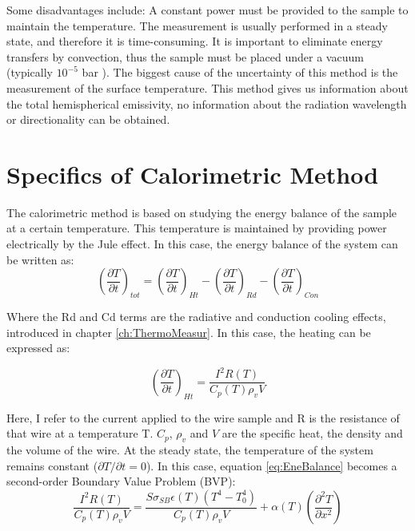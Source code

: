 Some disadvantages include: A constant power must be provided to the sample to maintain the temperature. The measurement is usually performed in a steady state, and therefore it is time-consuming. It is important to eliminate energy transfers by convection, thus the sample must be placed under a vacuum (typically $10^{-5}$ bar ). The biggest cause of the uncertainty of this method is the measurement of the surface temperature. This method gives us information about the total hemispherical emissivity, no information about the radiation wavelength or directionality can be obtained. 

\section{Specifics of Calorimetric Method}
\label{sec:CalMeth}

The calorimetric method is based on studying the energy balance of the sample at a certain temperature. This temperature is maintained by providing power electrically by the Jule effect. In this case, the energy balance of the system can be written as:
\begin{equation}
    \left(\frac{\partial T}{\partial t}\right)_{tot} = \left(\frac{\partial T}{\partial t}\right)_{Ht} - \left(\frac{\partial T}{\partial t}\right)_{Rd} - \left(\frac{\partial T}{\partial t}\right)_{Con}
    \label{eq:EneBalance}
\end{equation}

Where the Rd and Cd terms are the radiative and conduction cooling effects, introduced in chapter \ref{ch:ThermoMeasur}. In this case, the heating can be expressed as: 

\begin{equation}
    \left(\frac{\partial T}{\partial t}\right)_{Ht} = \frac{I^2 R(T)}{C_p(T)\rho_v V}
\end{equation}

Here, I refer to the current applied to the wire sample and R is the resistance of that wire at a temperature T. $C_p$, $\rho_v$ and $V$ are the specific heat, the density and the volume of the wire. At the steady state, the temperature of the system remains constant ($\partial T/ \partial t = 0$). In this case, equation \ref{eq:EneBalance} becomes a second-order Boundary Value Problem (BVP): 
\begin{equation}
    \frac{I^2 R(T)}{C_p(T)\rho_v V} =  \frac{S \sigma_{SB} \epsilon(T) \left( T^4 - T_{0}^{4}\right)}{C_p (T) \rho_v V} + \alpha(T)\left(\frac{\partial^2T}{\partial x^2}\right)
    \label{eq:ExplicitEneBalance}
\end{equation}

